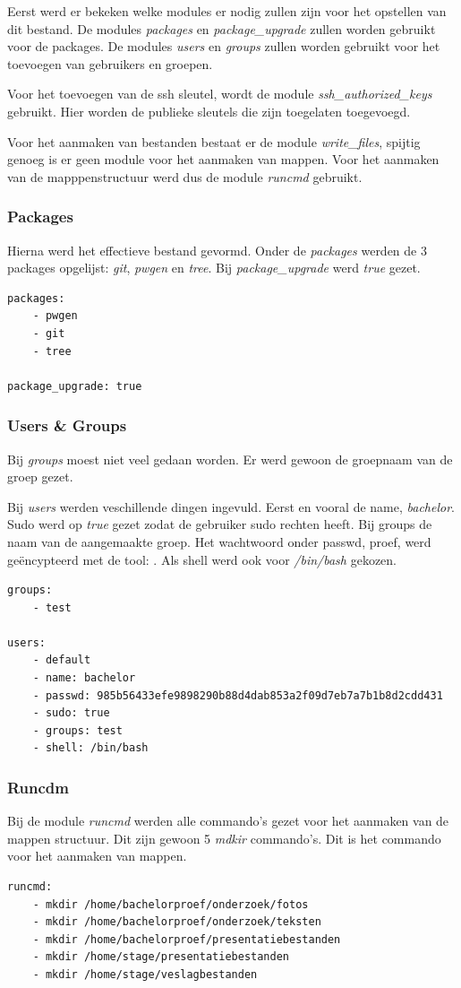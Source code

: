 Eerst werd er bekeken welke modules er nodig zullen zijn voor het opstellen van dit bestand. De modules \textit{packages} en \textit{package\_upgrade} zullen worden gebruikt voor de packages. De modules \textit{users} en \textit{groups} zullen worden gebruikt voor het toevoegen van gebruikers en groepen. 

Voor het toevoegen van de ssh sleutel, wordt de module \textit{ssh\_authorized\_keys} gebruikt. Hier worden de publieke sleutels die zijn toegelaten toegevoegd.

Voor het aanmaken van bestanden bestaat er de module \textit{write\_files}, spijtig genoeg is er geen module voor het aanmaken van mappen. Voor het aanmaken van de mapppenstructuur werd dus de module \textit{runcmd} gebruikt.

\subsubsection{Packages}
Hierna werd het effectieve bestand gevormd. Onder de \textit{packages} werden de 3 packages opgelijst: \textit{git}, \textit{pwgen} en \textit{tree}. Bij \textit{package\_upgrade} werd \textit{true} gezet. 
\begin{lstlisting}
packages:
    - pwgen
    - git
    - tree

package_upgrade: true
\end{lstlisting}

\subsubsection{Users \& Groups}
Bij \textit{groups} moest niet veel gedaan worden. Er werd gewoon de groepnaam van de groep gezet.

Bij \textit{users} werden veschillende dingen ingevuld. Eerst en vooral de name, \textit{bachelor}. Sudo werd op \textit{true} gezet zodat de gebruiker sudo rechten heeft. Bij groups de naam van de aangemaakte groep. Het wachtwoord onder passwd, proef, werd geëncypteerd met de tool: \autocite{toolmkpass}. Als shell werd ook voor \textit{/bin/bash} gekozen.
\begin{lstlisting}
groups:
    - test

users:
    - default
    - name: bachelor
    - passwd: 985b56433efe9898290b88d4dab853a2f09d7eb7a7b1b8d2cdd431
    - sudo: true
    - groups: test
    - shell: /bin/bash
\end{lstlisting}


\subsubsection{Runcdm}
Bij de module \textit{runcmd} werden alle commando's gezet voor het aanmaken van de mappen structuur. Dit zijn gewoon 5 \textit{mdkir} commando's. Dit is het commando voor het aanmaken van mappen.
\begin{lstlisting}
runcmd:
    - mkdir /home/bachelorproef/onderzoek/fotos
    - mkdir /home/bachelorproef/onderzoek/teksten
    - mkdir /home/bachelorproef/presentatiebestanden
    - mkdir /home/stage/presentatiebestanden
    - mkdir /home/stage/veslagbestanden
\end{lstlisting}

